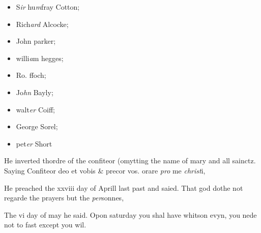 \documentclass[12pt, a4paper]{book}
\begin{document}
               		
               			\begin{itemize}
               				\item[]S\textit{ir} hu\textit{m}fray Cotton;
               				\item[]Rich\textit{ard} Alcocke;
               				\item[]John parker;
               				\item[]willi\textit{a}m hegges;
               				\item[]Ro. ffoch; 
               				\item[]Jo\textit{hn} Bayly;
               				\item[]walt\textit{er} Coiff;
               				\item[]George Sorel;
               				\item[]pet\textit{er} Short
               			\end{itemize}
               			
			
               		
		\ifthenelse{\isodd{\thepage}}
		{\reversemarginpar}
		{\normalmarginpar}
		He inverted thordre of the confiteor (omytting
 the name of mary and all sainctz. Saying
 Confiteor deo et vobis \& precor vos. orare \textit{pro} me \textit{christ}i,
               	
               	
               		
		\ifthenelse{\isodd{\thepage}}
		{\reversemarginpar}
		{\normalmarginpar}
		He preached the xxviii day of Aprill last past
 and saied. That god dothe not regarde the
 prayers but the \textit{per}sonnes,
               	
               	
               		
				\marginpar[\vspace{0.5cm}{\textcolor{Gray}{fastynge}}]{}
			
               		
		\ifthenelse{\isodd{\thepage}}
		{\reversemarginpar}
		{\normalmarginpar}
		The vi day of may he said. Opon saturday you shal have whitson
 evyn, you nede not to fast except you wil.
			
               	
 

            
            
\end{document}
